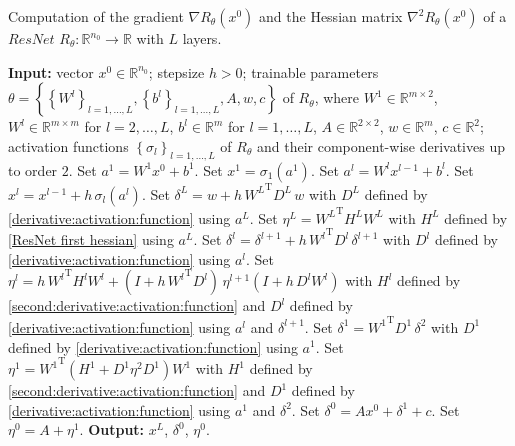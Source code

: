 \begin{algorithm}[H]
    \caption{Computation of the gradient $\nabla R_{\theta} \left( x^0 \right)$ and the Hessian matrix $\nabla^2 R_{\theta} \left( x^0 \right)$ of a $ResNet$ $R_{\theta} \colon \mathbb{R}^{n_0} \to \mathbb{R}$ with $L$ layers.} \label{Algorithm 2}
    \begin{algorithmic}[1]
        \State \textbf{Input:} vector $x^0 \in \mathbb{R}^{n_0}$; stepsize $h > 0$; trainable parameters $\theta = \left\{ \left\{ W^l \right\}_{l = 1, \ldots, L}, \left\{ b^l \right\}_{l = 1, \ldots, L}, A, w, c \right\}$ of $R_{\theta}$, where $W^1 \in \mathbb{R}^{m \times 2}$, $W^l \in \mathbb{R}^{m \times m}$ for $l = 2, \ldots, L$, $b^l \in \mathbb{R}^{m}$ for $l = 1, \ldots, L$, $A \in \mathbb{R}^{2 \times 2}$, $w \in \mathbb{R}^m$, $c \in \mathbb{R}^2$; activation functions $\left\{ \sigma_{l} \right\}_{l = 1, \ldots, L}$ of $R_{\theta}$ and their component-wise derivatives up to order $2$.
        \State Set $a^1 = W^1 x^{0} + b^1$.
        \State Set $x^1 = \sigma_1(a^1)$.
            \State Set $a^l = W^l x^{l-1} + b^l$.
            \State Set $x^l = x^{l-1} + h \, \sigma_l(a^l)$.
        \EndFor
        \State Set $\delta^{L} = w + h \, {W^{L}}^{\mathrm{T}} D^{L} \, w$ with $D^L$ defined by \cref{derivative:activation:function} using $a^L$.
        \State Set $\eta^{L} = {W^L}^{\mathrm{T}} H^L W^L$ with $H^L$ defined by \cref{ResNet first hessian} using $a^L$.
            \State Set $\delta^{l} = \delta^{l+1} + h \, {W^{l}}^{\mathrm{T}} D^{l} \, \delta^{l+1}$ with $D^l$ defined by \cref{derivative:activation:function} using $a^l$.
            \State Set $\eta^{l} = h \, {W^{l}}^{\mathrm{T}} H^{l} W^{l} + \left( I + h \, {W^{l}}^{\mathrm{T}} D^{l} \right) \, \eta^{l+1}  \left( I + h \,  D^{l} {W^{l}} \right)$
            \StatexIndent[1] with $H^l$ defined by \cref{second:derivative:activation:function} and $D^l$ defined by \cref{derivative:activation:function} 
            \StatexIndent[1] using $a^l$ and $\delta^{l+1}$.
        \EndFor
        \State Set $\delta^{1} = {W^{1}}^{\mathrm{T}} D^{1} \, \delta^{2}$ with $D^1$ defined by \cref{derivative:activation:function} using $a^1$.
        \State Set $\eta^{1} = {W^{1}}^{\mathrm{T}} \left( H^{1} + D^{1} \eta^{2} D^{1} \right) W^{1}$ with $H^1$ defined by \cref{second:derivative:activation:function} and 
        \StatexIndent[1] $D^1$ defined by \cref{derivative:activation:function} using $a^1$ and $\delta^{2}$.
        \State Set $\delta^{0} = A x^0 + \delta^{1} + c$.
        \State Set $\eta^{0} = A + \eta^{1}$.
        \State \textbf{Output:} $x^L$, $\delta^0$, $\eta^0$.
    \end{algorithmic}
\end{algorithm}

